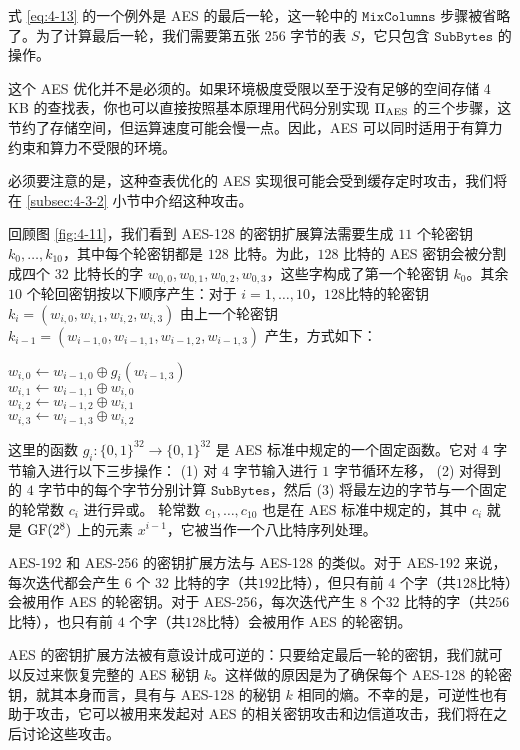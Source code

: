 \begin{snote}
式 \ref{eq:4-13} 的一个例外是 AES 的最后一轮，这一轮中的 $\mathtt{MixColumns}$ 步骤被省略了。为了计算最后一轮，我们需要第五张 $256$ 字节的表 $S$，它只包含 $\mathtt{SubBytes}$ 的操作。

这个 AES 优化并不是必须的。如果环境极度受限以至于没有足够的空间存储 4 KB 的查找表，你也可以直接按照基本原理用代码分别实现 $\Pi_{\rm AES}$ 的三个步骤，这节约了存储空间，但运算速度可能会慢一点。因此，AES 可以同时适用于有算力约束和算力不受限的环境。

必须要注意的是，这种查表优化的 AES 实现很可能会受到缓存定时攻击，我们将在 \ref{subsec:4-3-2} 小节中介绍这种攻击。
\end{snote}


\begin{snote}
回顾图 \ref{fig:4-11}，我们看到 AES-128 的密钥扩展算法需要生成 $11$ 个轮密钥 $k_0,\dots,k_{10}$，其中每个轮密钥都是 $128$ 比特。为此，$128$ 比特的 AES 密钥会被分割成四个 $32$ 比特长的字 $w_{0,0},w_{0,1},w_{0,2},w_{0,3}$，这些字构成了第一个轮密钥 $k_0$。其余 $10$ 个轮回密钥按以下顺序产生：对于 $i=1,\dots,10$，$128$比特的轮密钥 $k_i=(w_{i,0},w_{i,1},w_{i,2},w_{i,3})$ 由上一个轮密钥 $k_{i-1}=(w_{i-1,0},w_{i-1,1},w_{i-1,2},w_{i-1,3})$ 产生，方式如下：
 
\vspace*{5pt}

\hspace*{5pt} $w_{i,0}\leftarrow w_{i-1,0}\oplus g_i(w_{i-1,3})$\\
\hspace*{26pt} $w_{i,1}\leftarrow w_{i-1,1}\oplus w_{i,0}$\\
\hspace*{26pt} $w_{i,2}\leftarrow w_{i-1,2}\oplus w_{i,1}$\\
\hspace*{26pt} $w_{i,3}\leftarrow w_{i-1,3}\oplus w_{i,2}$

\vspace*{5pt}

\noindent
这里的函数 $g_i:\{0,1\}^{32}\to\{0,1\}^{32}$ 是 AES 标准中规定的一个固定函数。它对 $4$ 字节输入进行以下三步操作：
(1) 对 $4$ 字节输入进行 $1$ 字节循环左移，
(2) 对得到的 $4$ 字节中的每个字节分别计算 $\mathtt{SubBytes}$，然后
(3) 将最左边的字节与一个固定的轮常数 $c_i$ 进行异或。
轮常数 $c_1,\dots,c_{10}$ 也是在 AES 标准中规定的，其中 $c_i$ 就是 ${\rm GF}(2^8)$ 上的元素 $x^{i-1}$，它被当作一个八比特序列处理。

AES-192 和 AES-256 的密钥扩展方法与 AES-128 的类似。对于 AES-192 来说，每次迭代都会产生 $6$ 个 $32$ 比特的字（共$192$比特），但只有前 $4$ 个字（共$128$比特）会被用作 AES 的轮密钥。对于 AES-256，每次迭代产生 $8$ 个$32$ 比特的字（共$256$比特），也只有前 $4$ 个字（共$128$比特）会被用作 AES 的轮密钥。

AES 的密钥扩展方法被有意设计成可逆的：只要给定最后一轮的密钥，我们就可以反过来恢复完整的 AES 秘钥 $k$。这样做的原因是为了确保每个 AES-128 的轮密钥，就其本身而言，具有与 AES-128 的秘钥 $k$ 相同的熵。不幸的是，可逆性也有助于攻击，它可以被用来发起对 AES 的相关密钥攻击和边信道攻击，我们将在之后讨论这些攻击。
\end{snote}

